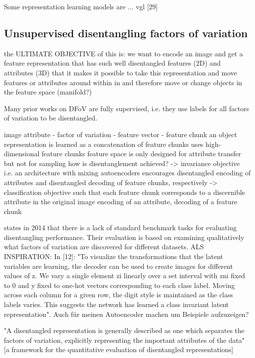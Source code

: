 \documentclass[11pt,a4paper]{article}
\begin{document}
Some representation learning models are ... vgl [29]

\subsection{Unsupervised disentangling factors of variation}
\par the ULTIMATE OBJECTIVE of this is: we want to encode an image and get a feature representation that has such well disentangled features (2D) and attributes (3D) that it makes it possible to take this representation and move features or attributes around within in and therefore move or change objects in the feature space (manifold?)

\par Many prior works on DFoV are fully supervised, i.e. they use labels for all factors of variation to be disentangled.

\par image attribute - factor of variation - feature vector - feature chunk
an object representation is learned as a concatenation of feature chunks
uses high-dimensional feature chunks
feature space is only designed for attribute transfer but not for sampling
how is disentanglement achieved? 
-> invariance objective i.e. an architecture with mixing autoencoders encourages disentangled encoding of attributes and disentangled decoding of feature chunks, respectively
-> classification objective such that each feature chunk corresponds to a discernible attribute in the original image 
encoding of an attribute, decoding of a feature chunk

\par\cite{1412.6583} states in 2014 that there is a lack of standard benchmark tasks for evaluating disentangling performance. Their evaluation is based on examining qualitatively what factors of variation are discovered for different datasets. ALS INSPIRATION: In [12]: "To visualize the transformations that the latent variables are learning, the decoder can be used to create images for different values of z. We vary a single element zi linearly over a set interval with zni fixed to 0 and y fixed to one-hot vectors corresponding to each class label. Moving across each column for a given row, the digit style is maintained as the class labels varies. This suggests the network has learned a class invariant latent representation". Auch für meinen Autoencoder machen um Beispiele aufzuzeigen?

\par "A disentangled representation is generally described as one which separates the factors of variation, explicitly representing the important attributes of the data" [a framework for the quantitative evaluation of disentangled representations]
\end{document}
